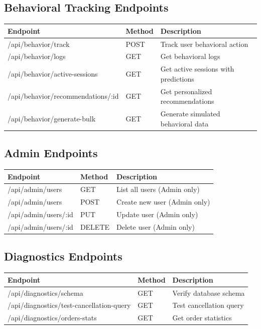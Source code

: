 \documentclass[12pt,a4paper]{article}
\begin{document}
\subsection{Behavioral Tracking Endpoints}

\begin{longtable}{|p{4.5cm}|p{1.5cm}|p{7cm}|}
\hline
\textbf{Endpoint} & \textbf{Method} & \textbf{Description} \\
\hline
/api/behavior/track & POST & Track user behavioral action \\
\hline
/api/behavior/logs & GET & Get behavioral logs \\
\hline
/api/behavior/active-sessions & GET & Get active sessions with predictions \\
\hline
/api/behavior/recommendations/:id & GET & Get personalized recommendations \\
\hline
/api/behavior/generate-bulk & GET & Generate simulated behavioral data \\
\hline
\end{longtable}

\subsection{Admin Endpoints}

\begin{longtable}{|p{3.5cm}|p{1.5cm}|p{8cm}|}
\hline
\textbf{Endpoint} & \textbf{Method} & \textbf{Description} \\
\hline
/api/admin/users & GET & List all users (Admin only) \\
\hline
/api/admin/users & POST & Create new user (Admin only) \\
\hline
/api/admin/users/:id & PUT & Update user (Admin only) \\
\hline
/api/admin/users/:id & DELETE & Delete user (Admin only) \\
\hline
\end{longtable}

\subsection{Diagnostics Endpoints}

\begin{longtable}{|p{5cm}|p{1.5cm}|p{6.5cm}|}
\hline
\textbf{Endpoint} & \textbf{Method} & \textbf{Description} \\
\hline
/api/diagnostics/schema & GET & Verify database schema \\
\hline
/api/diagnostics/test-cancellation-query & GET & Test cancellation query \\
\hline
/api/diagnostics/orders-stats & GET & Get order statistics \\
\hline
\end{longtable}
\end{document}
